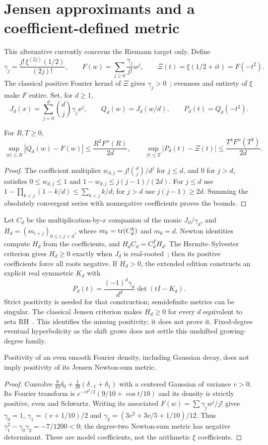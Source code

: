 \section{Jensen approximants and a coefficient-defined metric}
This alternative currently concerns the Riemann target only. Define
\[
 \gamma_j=\frac{j!\,\xi^{(2j)}(1/2)}{(2j)!},\qquad
 F(w)=\sum_{j\ge0}\frac{\gamma_j}{j!}w^j,\qquad
 \Xi(t)=\xi(1/2+it)=F(-t^2).
\]
The classical positive Fourier kernel of $\Xi$ gives $\gamma_j>0$~\cite{romik};
evenness and entirety of $\xi$ make $F$ entire. Set, for $d\ge1$,
\[
 J_d(x)=\sum_{j=0}^d\binom dj\gamma_jx^j,\qquad
 Q_d(w)=J_d(w/d),\qquad P_d(t)=Q_d(-t^2).
\]
\begin{proposition}
For $R,T\ge0$,
\[
 \sup_{|w|\le R}|Q_d(w)-F(w)|\le\frac{R^2F''(R)}{2d},\qquad
 \sup_{|t|\le T}|P_d(t)-\Xi(t)|\le\frac{T^4F''(T^2)}{2d}.
\]
\end{proposition}
\begin{proof}
The coefficient multiplier $w_{d,j}=j!\binom dj/d^j$ for $j\le d$,
and $0$ for $j>d$, satisfies
$0\le w_{d,j}\le1$ and $1-w_{d,j}\le j(j-1)/(2d)$.
For $j\le d$ use $1-\prod_{k<j}(1-k/d)\le\sum_{k<j}k/d$;
for $j>d$ use $j(j-1)\ge2d$. Summing the absolutely convergent
series with nonnegative coefficients proves the bounds.
\end{proof}

Let $C_d$ be the multiplication-by-$x$ companion of the monic
$J_d/\gamma_d$, and $H_d=(m_{i+j})_{0\le i,j<d}$, where
$m_k=\operatorname{tr}(C_d^k)$ and $m_0=d$. Newton identities compute $H_d$
from the coefficients, and $H_dC_d=C_d^T H_d$.
The Hermite--Sylvester criterion gives $H_d\ge0$ exactly when
$J_d$ is real-rooted~\cite{hermitesylvester}; then its positive coefficients
force all roots negative. If $H_d>0$, the extended edition constructs
an explicit real symmetric $K_d$ with
\[
 P_d(t)=\frac{(-1)^d\gamma_d}{d^d}\det(tI-K_d).
\]
Strict positivity is needed for that construction; semidefinite metrics
can be singular. The classical Jensen criterion makes $H_d\ge0$ for
every $d$ equivalent to zeta RH~\cite{jensen}. This identifies the missing
positivity; it does not prove it. Fixed-degree eventual hyperbolicity
as the shift grows does not settle this unshifted growing-degree family.

\begin{proposition}
Positivity of an even smooth Fourier density, including Gaussian decay,
does not imply positivity of its Jensen Newton-sum metric.
\end{proposition}
\begin{proof}
Convolve $\frac9{10}\delta_0+\frac1{20}(\delta_{-1}+\delta_1)$ with a
centered Gaussian of variance $v>0$. Its Fourier transform is
$e^{-vt^2/2}(9/10+\cos t/10)$ and its density is strictly positive,
even and Schwartz. Writing its associated $F(w)=\sum\gamma_jw^j/j!$
gives $\gamma_0=1$, $\gamma_1=(v+1/10)/2$ and
$\gamma_2=(3v^2+3v/5+1/10)/12$. Thus
$\gamma_1^2-\gamma_0\gamma_2=-7/1200<0$; the degree-two
Newton-sum metric has negative determinant. These are model coefficients,
not the arithmetic $\xi$ coefficients.
\end{proof}

